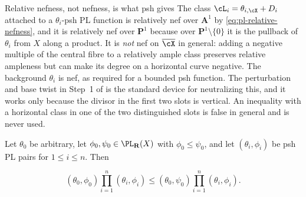\begin{warning}{Relative nefness, not nefness, is what psh gives}
\label{warn:ch46-relative-nef}
The class $\cL_i=\theta_{i,\cX}+D_i$ attached to a $\theta_i$-psh PL
function is relatively nef over $\mathbf A^1$ by
\eqref{eq:pl-relative-nefness}, and it is relatively nef over
$\mathbf P^1$ because over $\mathbf P^1\setminus\{0\}$ it is the
pullback of $\theta_i$ from $X$ along a product.  It is \emph{not}
nef on $\overline\cX$ in general: adding a negative multiple of the
central fibre to a relatively ample class preserves relative ampleness
but can make its degree on a horizontal curve negative. The background
$\theta_i$ is nef, as required for a bounded psh function.
The perturbation and base twist in Step~1 of
 is the standard device for
neutralizing this, and it works only because the divisor in the first two
slots is vertical.  An inequality with a horizontal class in one of the two
distinguished slots is false in general and is never used.
\end{warning}

\begin{proposition}\label{prop:bj-model-energy-monotonicity}
Let $\theta_0$ be arbitrary, let $\phi_0,\psi_0\in\PL_{\mathbf R}(X)$
with $\phi_0\leq\psi_0$, and let $(\theta_i,\phi_i)$ be psh PL
pairs for $1\le i\le n$. Then

\[
 (\theta_0,\phi_0)\prod_{i=1}^n(\theta_i,\phi_i)
 \leq
 (\theta_0,\psi_0)\prod_{i=1}^n(\theta_i,\phi_i).
\tag{46.7}\label{eq:bj-model-monotonicity}
\]
\end{proposition}

